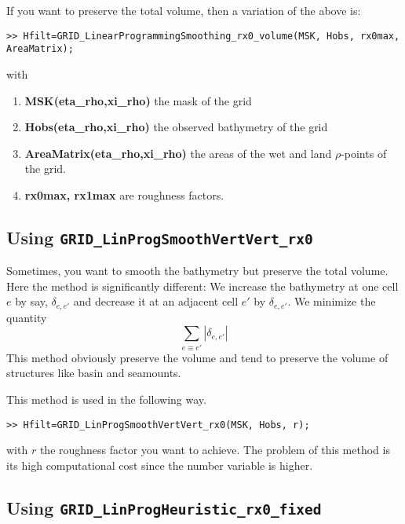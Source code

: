 \documentclass[12pt]{article}
\begin{document}
If you want to preserve the total volume, then a variation of the
above is:
\begin{verbatim}
>> Hfilt=GRID_LinearProgrammingSmoothing_rx0_volume(MSK, Hobs, rx0max, AreaMatrix);
\end{verbatim}
with
\begin{enumerate}
\item {\bf MSK(eta\_rho,xi\_rho)} the mask of the grid
\item {\bf Hobs(eta\_rho,xi\_rho)} the observed bathymetry of the grid
\item {\bf AreaMatrix(eta\_rho,xi\_rho)} the areas of the wet and land $\rho$-points of the grid.
\item {\bf rx0max, rx1max} are roughness factors.
\end{enumerate}






\subsection{Using {\tt GRID\_LinProgSmoothVertVert\_rx0}}

Sometimes, you want to smooth the bathymetry but preserve the
total volume. 
Here the method is significantly different: We increase the bathymetry
at one cell $e$ by say, $\delta_{e,e'}$ and decrease it at an adjacent
cell $e'$ by $\delta_{e,e'}$.
We minimize the quantity
\begin{equation*}
\sum_{e\equiv e'} |\delta_{e,e'}|
\end{equation*}
This method obviously preserve the volume and tend to preserve the volume
of structures like basin and seamounts.

This method is used in the following way.
\begin{verbatim}
>> Hfilt=GRID_LinProgSmoothVertVert_rx0(MSK, Hobs, r);
\end{verbatim}
with $r$ the roughness factor you want to achieve.
The problem of this method is its high computational cost since
the number variable is higher.




\subsection{Using {\tt GRID\_LinProgHeuristic\_rx0\_fixed}}
\end{document}
